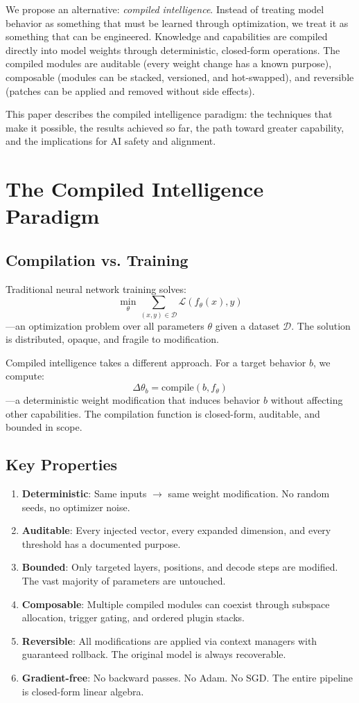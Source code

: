 \documentclass[11pt,a4paper]{article}
\begin{document}
We propose an alternative: \emph{compiled intelligence}. Instead of treating model behavior as something that must be learned through optimization, we treat it as something that can be engineered. Knowledge and capabilities are compiled directly into model weights through deterministic, closed-form operations. The compiled modules are auditable (every weight change has a known purpose), composable (modules can be stacked, versioned, and hot-swapped), and reversible (patches can be applied and removed without side effects).

This paper describes the compiled intelligence paradigm: the techniques that make it possible, the results achieved so far, the path toward greater capability, and the implications for AI safety and alignment.

\section{The Compiled Intelligence Paradigm}

\subsection{Compilation vs. Training}

Traditional neural network training solves:
\[
\min_{\theta} \sum_{(x,y) \in \mathcal{D}} \mathcal{L}(f_\theta(x), y)
\]
---an optimization problem over all parameters $\theta$ given a dataset $\mathcal{D}$. The solution is distributed, opaque, and fragile to modification.

Compiled intelligence takes a different approach. For a target behavior $b$, we compute:
\[
\Delta\theta_b = \text{compile}(b, f_\theta)
\]
---a deterministic weight modification that induces behavior $b$ without affecting other capabilities. The compilation function is closed-form, auditable, and bounded in scope.

\subsection{Key Properties}

\begin{enumerate}[leftmargin=*]
\item \textbf{Deterministic}: Same inputs $\rightarrow$ same weight modification. No random seeds, no optimizer noise.
\item \textbf{Auditable}: Every injected vector, every expanded dimension, and every threshold has a documented purpose.
\item \textbf{Bounded}: Only targeted layers, positions, and decode steps are modified. The vast majority of parameters are untouched.
\item \textbf{Composable}: Multiple compiled modules can coexist through subspace allocation, trigger gating, and ordered plugin stacks.
\item \textbf{Reversible}: All modifications are applied via context managers with guaranteed rollback. The original model is always recoverable.
\item \textbf{Gradient-free}: No backward passes. No Adam. No SGD. The entire pipeline is closed-form linear algebra.
\end{enumerate}
\end{document}
